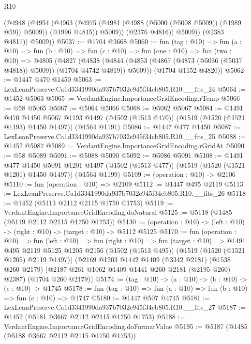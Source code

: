 \begin{lexlean}{R10}
\begin{coremodule}
                (@4948
                  (@4954
                    (@4963
                      (@4975 (@4981 (@4988 (@5000 (@5008 @5009)) (@1989 @59)) @5009))
                      (@1996 @4815))
                    @5009))
                (@2376 @4816))
              @5009))
          (@2383 @4817))
        @5009))
@5037 := @1704 @3668
@5060 := fun (tag : @10) =>
  fun (a : @10) =>
  fun (b : @10) =>
  fun (c : @10) =>
  fun (one : @10) =>
  fun (two : @10) =>
  @4805
    (@4827
      (@4838 (@4844 (@4853 (@4867 (@4873 (@5036 (@5037 @4818)) @5009)) (@1704 @4742 @4819)) @5009))
      (@1704 @1152 @4820))
@5062 := @1447 @470 @1450
@5063 := LexLeanPreserve.Ca1d3341990da937b7032e945f34cb805.R10.__fits_24
@5064 := @1452 @5063
@5065 := VerdantEngine.ImportanceGridEncoding.rTemp
@5066 := @58 @5065
@5067 := @5064 @5066
@5068 := @5062 @5067
@5084 := @1491
    @470
    @1450
    @5067
    @1193
    @1497
    (@1502 (@1513 @470))
    (@1519 (@1520 (@1521 @1193) @1450 @1497))
    (@1564 @1191)
@5086 := @1447 @477 @1450
@5087 := LexLeanPreserve.Ca1d3341990da937b7032e945f34cb805.R10.__fits_25
@5088 := @1452 @5087
@5089 := VerdantEngine.ImportanceGridEncoding.rGridAt
@5090 := @58 @5089
@5091 := @5088 @5090
@5092 := @5086 @5091
@5108 := @1491
    @477
    @1450
    @5091
    @1201
    @1497
    (@1502 (@1513 @477))
    (@1519 (@1520 (@1521 @1201) @1450 @1497))
    (@1564 @1199)
@5109 := (operation : @10) -> @2106
@5110 := fun (operation : @10) => @2109
@5112 := @1447 @495 @2119
@5113 := LexLeanPreserve.Ca1d3341990da937b7032e945f34cb805.R10.__fits_26
@5118 := @1452 (@5113 @2112 @2115 @1750 @1753)
@5119 := VerdantEngine.ImportanceGridEncoding.doNatural
@5125 := @5118 (@1485 (@5119 @2112 @2115 @1750 @1753))
@5130 := (operation : @10) -> (left : @10) -> (right : @10) -> (target : @10) -> @5112 @5125
@5170 := fun (operation : @10) =>
  fun (left : @10) =>
  fun (right : @10) =>
  fun (target : @10) =>
  @1491
    @495
    @2119
    @5125
    @1205
    @2156
    (@1502 (@1513 @495))
    (@1519 (@1520 (@1521 @1205) @2119 @1497))
    (@2169
      @1203
      @1442
      @1409
      (@3342 @2181)
      (@1538 @260 @2179)
      (@2187 @261 @1062 @1409 @1441 @260 @2181 (@2195 @260) @2387)
      (@1704 @260 @2179))
@5174 := (tag : @10) -> (a : @10) -> (b : @10) -> (c : @10) -> @1745
@5178 := fun (tag : @10) => fun (a : @10) => fun (b : @10) => fun (c : @10) => @1747
@5180 := @1447 @507 @4745
@5181 := LexLeanPreserve.Ca1d3341990da937b7032e945f34cb805.R10.__fits_27
@5187 := @1452 (@5181 @3667 @2112 @2115 @1750 @1753)
@5188 := VerdantEngine.ImportanceGridEncoding.doFormatValue
@5195 := @5187 (@1485 (@5188 @3667 @2112 @2115 @1750 @1753))

\end{coremodule}
\end{lexlean}
